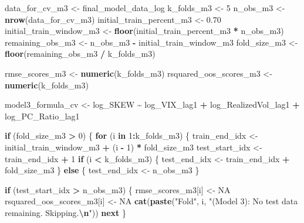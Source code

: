\documentclass[
]{article}
\newenvironment{Shaded}{\begin{snugshade}}{\end{snugshade}}
\newcommand{\ConstantTok}[1]{\textcolor[rgb]{0.56,0.35,0.01}{#1}}
\newcommand{\ControlFlowTok}[1]{\textcolor[rgb]{0.13,0.29,0.53}{\textbf{#1}}}
\newcommand{\DecValTok}[1]{\textcolor[rgb]{0.00,0.00,0.81}{#1}}
\newcommand{\FloatTok}[1]{\textcolor[rgb]{0.00,0.00,0.81}{#1}}
\newcommand{\FunctionTok}[1]{\textcolor[rgb]{0.13,0.29,0.53}{\textbf{#1}}}
\newcommand{\NormalTok}[1]{#1}
\newcommand{\OtherTok}[1]{\textcolor[rgb]{0.56,0.35,0.01}{#1}}
\newcommand{\SpecialCharTok}[1]{\textcolor[rgb]{0.81,0.36,0.00}{\textbf{#1}}}
\newcommand{\StringTok}[1]{\textcolor[rgb]{0.31,0.60,0.02}{#1}}
\begin{document}
\begin{Shaded}
\begin{Highlighting}[]
\NormalTok{  data\_for\_cv\_m3 }\OtherTok{\textless{}{-}}\NormalTok{ final\_model\_data\_log}
\NormalTok{  k\_folds\_m3 }\OtherTok{\textless{}{-}} \DecValTok{5}
\NormalTok{  n\_obs\_m3 }\OtherTok{\textless{}{-}} \FunctionTok{nrow}\NormalTok{(data\_for\_cv\_m3)}
\NormalTok{  initial\_train\_percent\_m3 }\OtherTok{\textless{}{-}} \FloatTok{0.70}
\NormalTok{  initial\_train\_window\_m3 }\OtherTok{\textless{}{-}} \FunctionTok{floor}\NormalTok{(initial\_train\_percent\_m3 }\SpecialCharTok{*}\NormalTok{ n\_obs\_m3)}
\NormalTok{  remaining\_obs\_m3 }\OtherTok{\textless{}{-}}\NormalTok{ n\_obs\_m3 }\SpecialCharTok{{-}}\NormalTok{ initial\_train\_window\_m3}
\NormalTok{  fold\_size\_m3 }\OtherTok{\textless{}{-}} \FunctionTok{floor}\NormalTok{(remaining\_obs\_m3 }\SpecialCharTok{/}\NormalTok{ k\_folds\_m3)}
  
\NormalTok{  rmse\_scores\_m3 }\OtherTok{\textless{}{-}} \FunctionTok{numeric}\NormalTok{(k\_folds\_m3)}
\NormalTok{  rsquared\_oos\_scores\_m3 }\OtherTok{\textless{}{-}} \FunctionTok{numeric}\NormalTok{(k\_folds\_m3)}
  
\NormalTok{  model3\_formula\_cv }\OtherTok{\textless{}{-}}\NormalTok{ log\_SKEW }\SpecialCharTok{\textasciitilde{}}\NormalTok{ log\_VIX\_lag1 }\SpecialCharTok{+}\NormalTok{ log\_RealizedVol\_lag1 }\SpecialCharTok{+}\NormalTok{ log\_PC\_Ratio\_lag1}
  
  \ControlFlowTok{if}\NormalTok{ (fold\_size\_m3 }\SpecialCharTok{\textgreater{}} \DecValTok{0}\NormalTok{) \{}
    \ControlFlowTok{for}\NormalTok{ (i }\ControlFlowTok{in} \DecValTok{1}\SpecialCharTok{:}\NormalTok{k\_folds\_m3) \{}
\NormalTok{      train\_end\_idx }\OtherTok{\textless{}{-}}\NormalTok{ initial\_train\_window\_m3 }\SpecialCharTok{+}\NormalTok{ (i }\SpecialCharTok{{-}} \DecValTok{1}\NormalTok{) }\SpecialCharTok{*}\NormalTok{ fold\_size\_m3}
\NormalTok{      test\_start\_idx }\OtherTok{\textless{}{-}}\NormalTok{ train\_end\_idx }\SpecialCharTok{+} \DecValTok{1}
      \ControlFlowTok{if}\NormalTok{ (i }\SpecialCharTok{\textless{}}\NormalTok{ k\_folds\_m3) \{}
\NormalTok{        test\_end\_idx }\OtherTok{\textless{}{-}}\NormalTok{ train\_end\_idx }\SpecialCharTok{+}\NormalTok{ fold\_size\_m3}
\NormalTok{      \} }\ControlFlowTok{else}\NormalTok{ \{}
\NormalTok{        test\_end\_idx }\OtherTok{\textless{}{-}}\NormalTok{ n\_obs\_m3 }
\NormalTok{      \}}
  
      \ControlFlowTok{if}\NormalTok{ (test\_start\_idx }\SpecialCharTok{\textgreater{}}\NormalTok{ n\_obs\_m3) \{}
\NormalTok{        rmse\_scores\_m3[i] }\OtherTok{\textless{}{-}} \ConstantTok{NA}
\NormalTok{        rsquared\_oos\_scores\_m3[i] }\OtherTok{\textless{}{-}} \ConstantTok{NA}
        \FunctionTok{cat}\NormalTok{(}\FunctionTok{paste}\NormalTok{(}\StringTok{"Fold"}\NormalTok{, i, }\StringTok{"(Model 3): No test data remaining. Skipping.}\SpecialCharTok{\textbackslash{}n}\StringTok{"}\NormalTok{))}
        \ControlFlowTok{next}
\NormalTok{      \}}
      

\end{Highlighting}
\end{Shaded}
\end{document}
